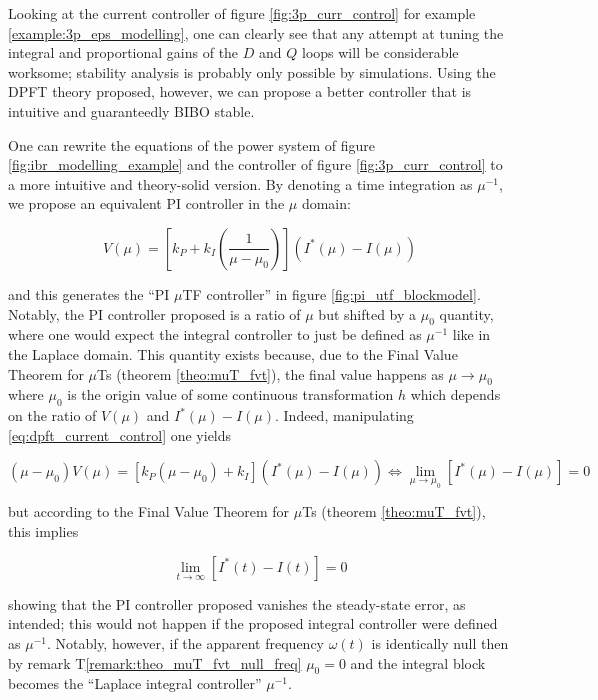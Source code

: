 	Looking at the current controller of figure \eqref{fig:3p_curr_control} for example \ref{example:3p_eps_modelling}, one can clearly see that any  attempt at tuning the integral and proportional gains of the $D$ and $Q$ loops will be considerable worksome; stability analysis is probably only possible by simulations. Using the DPFT theory proposed, however, we can propose a better controller that is intuitive and guaranteedly BIBO stable.

	One can rewrite the equations of the power system of figure \ref{fig:ibr_modelling_example} and the controller of figure \ref{fig:3p_curr_control} to a more intuitive and theory-solid version. By denoting a time integration as $\mu^{-1}$, we propose an equivalent PI controller in the $\mu$ domain:

\begin{equation} V\left(\mu\right) = \left[k_P + k_I \left(\dfrac{1}{\mu - \mu_0}\right)\right]\left(I^*\left(\mu\right) - I\left(\mu\right)\right) \label{eq:dpft_current_control}\end{equation}

	\noindent and this generates the ``PI $\mu$TF controller'' in figure \ref{fig:pi_utf_blockmodel}. Notably, the PI controller proposed is a ratio of $\mu$ but shifted by a $\mu_0$ quantity, where one would expect the integral controller to just be defined as $\mu^{-1}$ like in the Laplace domain. This quantity exists because, due to the Final Value Theorem for $\mu$Ts (theorem \ref{theo:muT_fvt}), the final value happens as $\mu\to\mu_0$ where $\mu_0$ is the origin value of some continuous transformation $h$ which depends on the ratio of $V(\mu)$ and $I^*(\mu) - I(\mu)$. Indeed, manipulating \eqref{eq:dpft_current_control} one yields

\begin{equation} \left(\mu - \mu_0\right)V\left(\mu\right) = \left[k_P\left(\mu - \mu_0\right) + k_I \right]\left(I^*\left(\mu\right) - I\left(\mu\right)\right) \Leftrightarrow \lim_{\mu\to\mu_0} \left[I^*\left(\mu\right) - I\left(\mu\right)\right] = 0\end{equation}

	\noindent but according to the Final Value Theorem for $\mu$Ts (theorem \ref{theo:muT_fvt}), this implies

\begin{equation} \lim_{t\to\infty} \left[I^*\left(t\right) - I\left(t\right)\right] = 0\end{equation}

	\noindent showing that the PI controller proposed vanishes the steady-state error, as intended; this would not happen if the proposed integral controller were defined as $\mu^{-1}$. Notably, however, if the apparent frequency $\omega(t)$ is identically null then by remark T\ref{remark:theo_muT_fvt_null_freq} $\mu_0 = 0$ and the integral block becomes the ``Laplace integral controller'' $\mu^{-1}$.


